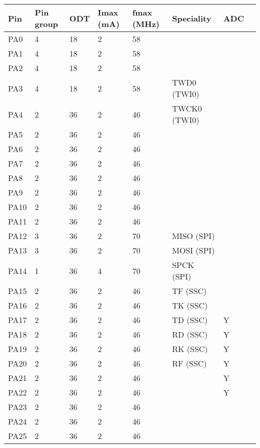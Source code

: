 \begin{table}
  \begin{tabular}{llllllll}
    Pin     & Pin group & ODT & Imax (mA) & fmax (MHz) & Speciality & ADC    \\ \hline
    PA0     &  4 & 18 &  2 & 58 &       &    \\
    PA1     &  4 & 18 &  2 & 58 &       &    \\
    PA2     &  4 & 18 &  2 & 58 &       &    \\
    PA3     &  4 & 18 &  2 & 58 & TWD0  (TWI0)      &    \\
    PA4     &  2 & 36 &  2 & 46 & TWCK0 (TWI0)      &    \\
    PA5     &  2 & 36 &  2 & 46 &       &    \\
    PA6     &  2 & 36 &  2 & 46 &       &    \\
    PA7     &  2 & 36 &  2 & 46 &       &    \\
    PA8     &  2 & 36 &  2 & 46 &       &    \\
    PA9     &  2 & 36 &  2 & 46 &       &    \\
    PA10    &  2 & 36 &  2 & 46 &       &    \\
    PA11    &  2 & 36 &  2 & 46 &       &    \\
    PA12    &  3 & 36 &  2 & 70 & MISO (SPI)      &    \\
    PA13    &  3 & 36 &  2 & 70 & MOSI (SPI)      &    \\
    PA14    &  1 & 36 &  4 & 70 & SPCK (SPI)      &    \\
    PA15    &  2 & 36 &  2 & 46 & TF (SSC)      &    \\
    PA16    &  2 & 36 &  2 & 46 & TK (SSC)      &    \\
    PA17    &  2 & 36 &  2 & 46 & TD (SSC)      &  Y   \\
    PA18    &  2 & 36 &  2 & 46 & RD (SSC)      &  Y  \\
    PA19    &  2 & 36 &  2 & 46 & RK (SSC)      &  Y  \\
    PA20    &  2 & 36 &  2 & 46 & RF (SSC)      &  Y  \\
    PA21    &  2 & 36 &  2 & 46 &       &  Y  \\
    PA22    &  2 & 36 &  2 & 46 &       &  Y  \\
    PA23    &  2 & 36 &  2 & 46 &       &    \\
    PA24    &  2 & 36 &  2 & 46 &       &    \\
    PA25    &  2 & 36 &  2 & 46 &       &    \\

\end{tabular}
\end{table}
